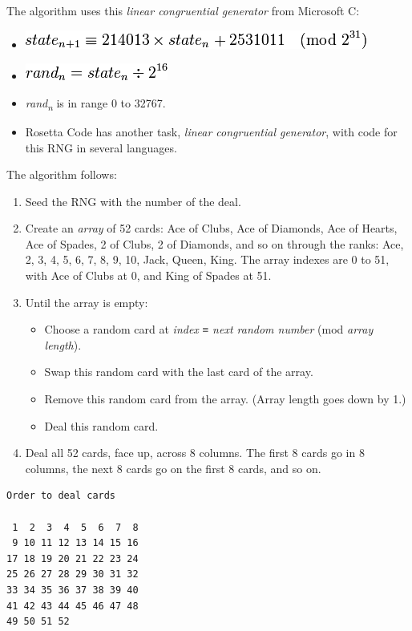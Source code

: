 The algorithm uses this \emph{linear congruential generator} from
Microsoft C:

\begin{itemize}
\item
  \includegraphics[scale=.6]{graphics/47c16228f3793455eb3436c78d21477d.png}
\item
  \includegraphics[scale=.6]{graphics/a026db06e1a9bd6945c85c8e17231725.png}
\item
  \emph{r}\emph{a}\emph{n}\emph{d}\textsubscript{\emph{n}} is in range 0
  to 32767.
\item Rosetta Code has another task, \emph{linear congruential
    generator}, with code for this RNG in several languages.
\end{itemize}

The algorithm follows:

\begin{enumerate}
\item
  Seed the RNG with the number of the deal.
\item
  Create an \emph{array} of 52 cards: Ace of Clubs, Ace of
  Diamonds, Ace of Hearts, Ace of Spades, 2 of Clubs, 2 of Diamonds, and
  so on through the ranks: Ace, 2, 3, 4, 5, 6, 7, 8, 9, 10, Jack, Queen,
  King. The array indexes are 0 to 51, with Ace of Clubs at 0, and King
  of Spades at 51.
\item
  Until the array is empty:

  \begin{itemize}
  \item
    Choose a random card at \emph{index} ≡ \emph{next random number}
    (mod \emph{array length}).
  \item
    Swap this random card with the last card of the array.
  \item
    Remove this random card from the array. (Array length goes down by
    1.)
  \item
    Deal this random card.
  \end{itemize}
\item
  Deal all 52 cards, face up, across 8 columns. The first 8 cards go in
  8 columns, the next 8 cards go on the first 8 cards, and so on.
\end{enumerate}

\pagebreak{}
\begin{verbatim}
Order to deal cards

 1  2  3  4  5  6  7  8
 9 10 11 12 13 14 15 16
17 18 19 20 21 22 23 24
25 26 27 28 29 30 31 32
33 34 35 36 37 38 39 40
41 42 43 44 45 46 47 48
49 50 51 52
\end{verbatim}

